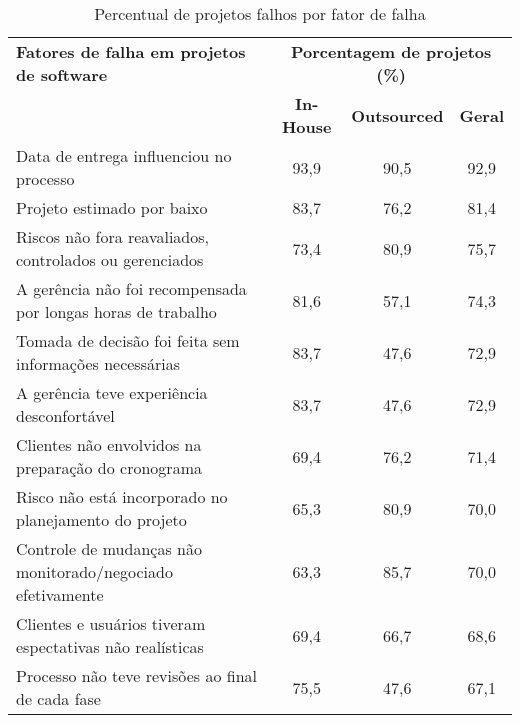 \begin{table}[ht]
	\centering
	\fontsize{8}{0}
	\caption{Percentual de projetos falhos por fator de falha}
	\label{falhas_em_projetos}
\begin{tabular}{lccc}

\hline

\textbf{Fatores de falha em projetos de software} & \multicolumn{3}{c}{\textbf{Porcentagem de projetos (\%)}}\tabularnewline

\cline{2-4}

& \textbf{In-House} & \textbf{Outsourced} & \textbf{Geral}\tabularnewline

\hline

Data de entrega influenciou no processo & 93,9 & 90,5 & 92,9\tabularnewline

\hline

Projeto estimado por baixo & 83,7 & 76,2 & 81,4\tabularnewline

\hline

Riscos não fora reavaliados, controlados ou gerenciados & 73,4 & 80,9 & 75,7\tabularnewline

\hline

A gerência não foi recompensada por longas horas de trabalho & 81,6 & 57,1 & 74,3\tabularnewline

\hline

Tomada de decisão foi feita sem informações necessárias & 83,7 & 47,6 & 72,9\tabularnewline

\hline

A gerência teve experiência desconfortável & 83,7 & 47,6 & 72,9\tabularnewline

\hline

Clientes não envolvidos na preparação do cronograma & 69,4 & 76,2 & 71,4\tabularnewline

\hline

Risco não está incorporado no planejamento do projeto & 65,3 & 80,9 & 70,0\tabularnewline

\hline

Controle de mudanças não monitorado/negociado efetivamente & 63,3 & 85,7 & 70,0\tabularnewline

\hline

Clientes e usuários tiveram espectativas não realísticas & 69,4 & 66,7 & 68,6\tabularnewline

\hline

Processo não teve revisões ao final de cada fase & 75,5 & 47,6 & 67,1\tabularnewline

\hline


\end{tabular}
\end{table}

